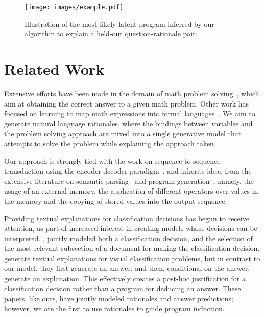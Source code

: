 \begin{figure*}[t]
\vspace{-0.8cm}
\centering
\texttt{[image: images/example.pdf]}
    \vspace{-2cm}\caption{Illustration of the most likely latent program inferred by our algorithm to explain a held-out question-rationale pair.}
    \label{example}
\end{figure*}

\section{Related Work}
Extensive efforts have been made in the domain of math problem solving~\cite{DBLP:conf/emnlp/HosseiniHEK14,kushman-EtAl:2014:P14-1,Roy2015SolvingGA}, which aim at obtaining the correct answer to a given math problem. Other work has focused on learning to map math expressions into formal languages~\cite{DBLP:journals/corr/RoyUR16}. We aim to generate natural language rationales, where the bindings between variables and the problem solving approach are mixed into a single generative model that attempts to solve the problem while explaining the approach taken.

Our approach is strongly tied with the work on sequence to sequence transduction using the encoder-decoder paradigm~\cite{DBLP:journals/corr/SutskeverVL14,DBLP:journals/corr/BahdanauCB14,kalchbrenner2013recurrent}, and inherits ideas from the extensive literature on semantic parsing~\cite{Jones:2012:SPB:2390524.2390593,BerantCFL13,andreas-vlachos-clark:2013:Short,quirk:acl15,DBLP:journals/corr/LiangBLFL16,neelakantan:2016} and program generation~\cite{DBLP:journals/corr/ReedF15,Graves_Nature2016}, namely, the usage of an external memory, the application of different operators over values in the memory and the copying of stored values into the output sequence. %

Providing textual explanations for classification decisions has begun to receive attention, as part of increased interest in creating models whose decisions can be interpreted. , jointly modeled both a classification decision, and the selection of the most relevant subsection of a document for making the classification decision. %
 generate textual explanations for visual classification problems, but in contrast to our model, they first generate an answer, and then, conditional on the answer, generate an explanation. This effectively creates a post-hoc justification for a classification decision rather than a program for deducing an answer. These papers, like ours, have jointly modeled rationales and answer predictions; however, we are the first to use rationales to guide program induction.

